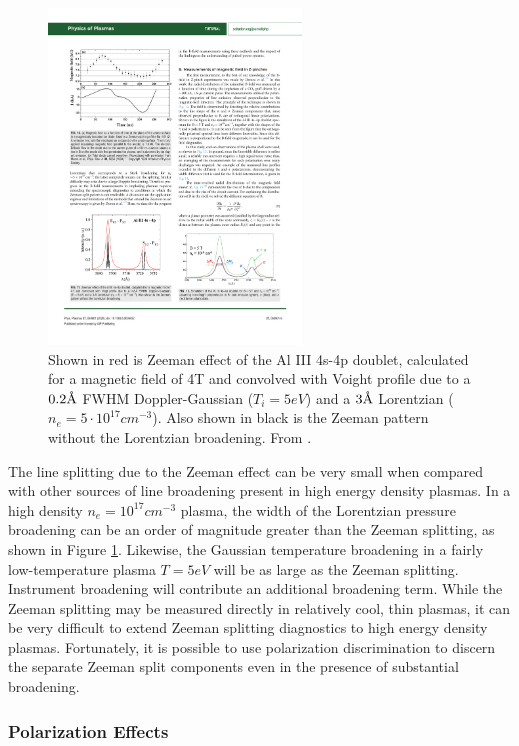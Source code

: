 \documentclass{jpp}
\newcommand{\angstrom}{\text{\normalfont\AA}}
\begin{document}
\begin{figure}
  \centering
  \includegraphics[width=0.6\textwidth]{pres7.pdf}
  \caption{Shown in red is Zeeman effect of the Al III 4s-4p doublet, calculated for a magnetic field of 4T and convolved with Voight profile due to a $0.2\angstrom$ FWHM Doppler-Gaussian ($T_i= 5 eV$) and a $3\angstrom$ Lorentzian ($n_e = 5 \cdot 10^{17} cm^{-3}$). Also shown in black is the Zeeman pattern without the Lorentzian broadening. From \citep{doi:10.1063/5.0009432}.}
\label{fig:broadening}
\end{figure}

The line splitting due to the Zeeman effect can be very small when compared with other sources of line broadening present in high energy density plasmas. In a high density $n_e = 10^{17} cm^{-3}$ plasma, the width of the Lorentzian pressure broadening can be an order of magnitude greater than the Zeeman splitting, as shown in Figure \ref{fig:broadening}. Likewise, the Gaussian temperature broadening in a fairly low-temperature plasma $T = 5 eV$ will be as large as the Zeeman splitting. Instrument broadening will contribute an additional broadening term. While the Zeeman splitting may be measured directly in relatively cool, thin plasmas, it can be very difficult to extend Zeeman splitting diagnostics to high energy density plasmas. Fortunately, it is possible to use polarization discrimination to discern the separate Zeeman split components even in the presence of substantial broadening.

\subsubsection{Polarization Effects}
\end{document}
